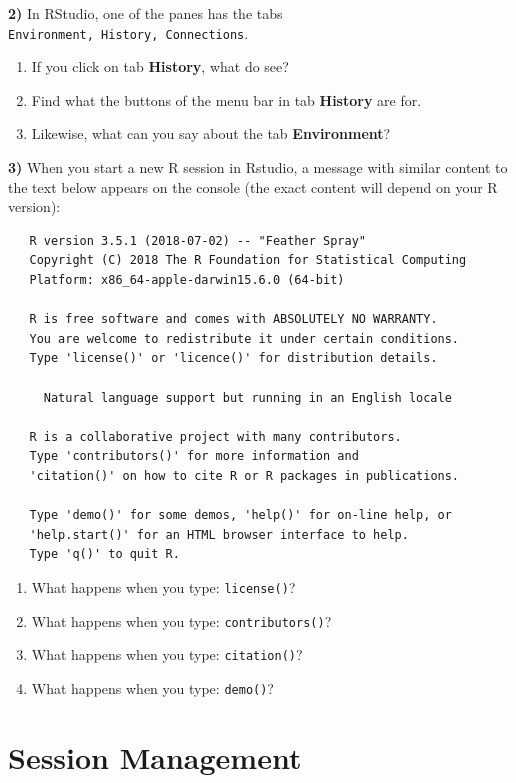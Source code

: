 \documentclass[
]{book}
\providecommand{\tightlist}{%
  \setlength{\itemsep}{0pt}\setlength{\parskip}{0pt}}
\begin{document}
\textbf{2)} In RStudio, one of the panes has the tabs \texttt{Environment,\ History,\ Connections}.

\begin{enumerate}
\def\labelenumi{\alph{enumi})}
\tightlist
\item
  If you click on tab \textbf{History}, what do see?
\item
  Find what the buttons of the menu bar in tab \textbf{History} are for.
\item
  Likewise, what can you say about the tab \textbf{Environment}?
\end{enumerate}

\textbf{3)} When you start a new R session in Rstudio, a message with similar content to
the text below appears on the console (the exact content will depend on your
R version):

\begin{verbatim}
   R version 3.5.1 (2018-07-02) -- "Feather Spray"
   Copyright (C) 2018 The R Foundation for Statistical Computing
   Platform: x86_64-apple-darwin15.6.0 (64-bit)

   R is free software and comes with ABSOLUTELY NO WARRANTY.
   You are welcome to redistribute it under certain conditions.
   Type 'license()' or 'licence()' for distribution details.

     Natural language support but running in an English locale   

   R is a collaborative project with many contributors.
   Type 'contributors()' for more information and
   'citation()' on how to cite R or R packages in publications.

   Type 'demo()' for some demos, 'help()' for on-line help, or
   'help.start()' for an HTML browser interface to help.
   Type 'q()' to quit R.
\end{verbatim}

\begin{enumerate}
\def\labelenumi{\alph{enumi})}
\item
  What happens when you type: \texttt{license()}?
\item
  What happens when you type: \texttt{contributors()}?
\item
  What happens when you type: \texttt{citation()}?
\item
  What happens when you type: \texttt{demo()}?
\end{enumerate}

\hypertarget{session}{%
\chapter{Session Management}\label{session}}
\end{document}
